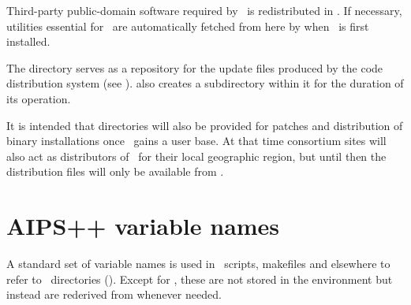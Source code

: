 Third-party public-domain software required by \aipspp\ is redistributed in
.  If necessary, utilities essential for \aipspp\ are
automatically fetched from here by  when \aipspp\ is first
installed.

The  directory serves as a repository for the update files
produced by the code distribution system (see ).
 also creates a  subdirectory within it for the
duration of its operation.

It is intended that  directories will also be provided for
patches and distribution of binary installations once \aipspp\ gains a user
base.  At that time consortium sites will also act as distributors of
\aipspp\ for their local geographic region, but until then the 
distribution files will only be available from .

 
\section{AIPS++ variable names}
\label{variables}
 
A standard set of variable names is used in \aipspp\ scripts, makefiles and
elsewhere to refer to \aipspp\ directories ().  Except for
, these are not stored in the environment but instead are
rederived from  whenever needed.  

